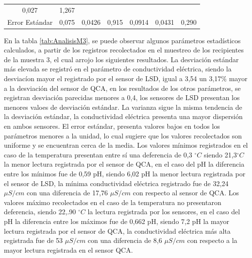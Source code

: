 \begin{table}[H]
\begin{tabular}{lccc|ccc}
\multicolumn{1}{c}{0,027}                                       & 
\multicolumn{1}{c}{1,267}  \\ Error Estándar                    & \multicolumn{1}{c}{0,075}                                       & \multicolumn{1}{c}{0,0426} & 0,915                              & 
\multicolumn{1}{c}{0,0914}                                      & 
\multicolumn{1}{c}{0,0431}                                      & 
\multicolumn{1}{c|}{0,290}  \\ 
\hline
\end{tabular}
\end{table}

En la tabla \ref{tab:AnalisisM3}, se puede observar algunos par\'ametros estad\'isticos calculados, a partir de los registros recolectados en el muestreo de los recipientes de la muestra 3, el cual arrojo los siguientes resultados. 
La desviaci\'on est\'andar m\'as elevada se registr\'o en el par\'ametro de conductividad el\'ectrica, siendo la desviac\'ion  mayor el registrado por el sensor de LSD, igual a 3,54 un  3,17\%  mayor a la desviación del sensor de QCA, en los resultados de  los otros par\'ametros, se registran  desviaci\'on parecidas menores a 0,4, los sensores de LSD presentan los menores valoes de desviaci\'on est\'andar. 
La varianza sigue la misma tendencia de la desviaci\'on est\'andar, la conductividad el\'ectrica presenta una mayor dispersi\'on en ambos sensores. 
El error est\'andar, presenta valores bajos en todos los par\'ametros menores a la unidad, lo cual sugiere que los valores recolectados son uniforme y se encuentran cerca de la media. 
Los valores m\'inimos registrados en el caso de la temperatura presentan entre s\'i una deferencia de 0,3 $ ^{\circ}C$ siendo 21,3$ ^{\circ}C$ la menor lectura registrada por el sensor de QCA, en el caso del pH la diferencia entre los m\'inimos fue de 0,59 pH, siendo 6,02 pH la menor lectura registrada por el sensor de LSD, la m\'inima conductividad el\'ectrica registrado fue de 32,24 $\mu S/cm$ con una diferencia de 17,76 $\mu S/cm$ con respecto al sensor de QCA. 
Los valores m\'aximo recolectados en el caso de la temperatura no presentaron deferencia, siendo 22,.90 $ ^{\circ}C$ la  lectura registrada por los sensores, en el caso del pH la diferencia entre los m\'aximos fue de 0,662 pH, siendo 7,2 pH la mayor lectura registrada por el sensor de QCA, la conductividad el\'ectrica m\'as alta registrada fue de 53 $\mu S/cm$ con una diferencia de 8,6 $\mu S/cm$ con respecto a la mayor lectura registrada en el sensor QCA.
